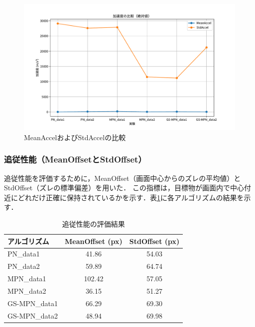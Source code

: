 \begin{figure}[H]
    \centering
    \includegraphics[width=1\textwidth]{figure/Accel.pdf}
    \caption{MeanAccelおよびStdAccelの比較}
    \label{fig:accel_results}
\end{figure}

\subsubsection{追従性能（MeanOffsetとStdOffset）}
追従性能を評価するために，MeanOffset（画面中心からのズレの平均値）とStdOffset（ズレの標準偏差）を用いた．
この指標は，目標物が画面内で中心付近にどれだけ正確に保持されているかを示す．表\ref{tab:offset_results}に各アルゴリズムの結果を示す．

\begin{table}[H]
    \centering
    \caption{追従性能の評価結果}
    \label{tab:offset_results}
    \begin{tabular}{|l|c|c|}
        \hline
        \textbf{アルゴリズム} & \textbf{MeanOffset (px)} & \textbf{StdOffset (px)} \\ \hline
        PN\_data1             & 41.86                    & 54.03                   \\ \hline
        PN\_data2             & 59.89                    & 64.74                   \\ \hline
        MPN\_data1            & 102.42                   & 57.05                   \\ \hline
        MPN\_data2            & 36.15                    & 51.27                   \\ \hline
        GS-MPN\_data1         & 66.29                    & 69.30                   \\ \hline
        GS-MPN\_data2         & 48.94                    & 69.98                   \\ \hline
    \end{tabular}
\end{table}

